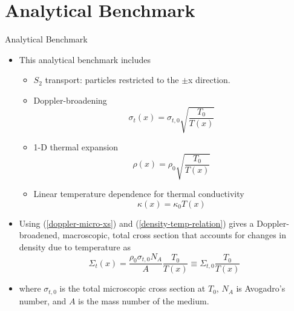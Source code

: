 \documentclass[9pt,t]{beamer}
\begin{document}
\section{Analytical Benchmark}
\begin{frame}{Analytical Benchmark}
    \pause
    \begin{itemize}
        \item <2-> This analytical benchmark includes
        \begin{itemize}
            \item <3-> $S_{2}$ transport: particles restricted to the $\pm$x direction.
            \item <4-> Doppler-broadening
            \begin{equation}\label{doppler-micro-xs}
                \sigma_{t}(x) = \sigma_{t,0}\sqrt{\frac{T_{0}}{T(x)}}
            \end{equation}
            \item <5-> 1-D thermal expansion
            \begin{equation} \label{density-temp-relation}
                \rho(x) =  \rho_{0} \sqrt{\frac{T_{0}}{T(x)}}
            \end{equation}
            \item <6-> Linear temperature dependence for thermal conductivity
            \begin{equation}\label{thermal-conductivity-temp-relation}
                \kappa(x) = \kappa_{0} T(x)
            \end{equation}
        \end{itemize}\vspace*{-0.4cm}
        \item <7->  Using (\ref{doppler-micro-xs}) and (\ref{density-temp-relation}) gives a Doppler-broadened, macroscopic, total cross section that accounts for changes in density due to temperature as
        \begin{equation}
            \Sigma_{t}(x) = \frac{\rho_{0}\sigma_{t,0} N_{A}}{A} \frac{T_{0}}{T(x)}
            \equiv\Sigma_{t,0}\frac{T_{0}}{T(x)}
        \end{equation}
        \item <7-> where $ \sigma_{t,0}$ is the total microscopic cross section at $T_{0}$, $N_{A}$ is Avogadro's number, and $A$ is the mass number
        of the medium.
        \end{itemize}
\end{frame}
\end{document}
